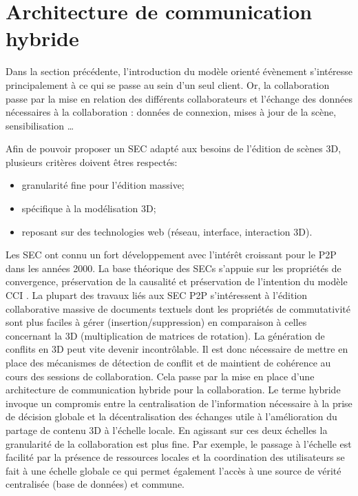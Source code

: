 \section{Architecture de communication hybride}


Dans la section précédente, l'introduction du modèle orienté évènement s'intéresse 
principalement à ce qui se passe au sein d'un seul client. Or, la collaboration 
passe par la mise en relation des différents collaborateurs et l'échange des 
données nécessaires à la collaboration : données de connexion, mises à jour de la 
scène, sensibilisation \dots 

Afin de pouvoir proposer un \gls{SEC} adapté aux besoins de l'édition de scènes 
3D, plusieurs critères doivent êtres respectés: 
\begin{itemize}
	\item granularité fine pour l'édition massive;
	\item spécifique à la modélisation 3D;
	\item reposant sur des technologies web (réseau, interface, interaction 3D).
\end{itemize}

Les \gls{SEC} ont connu un fort développement avec l'intérêt croissant 
pour le \gls{P2P} dans les années 2000. 
La base théorique des \glspl{SEC} s'appuie sur les propriétés de 
convergence, préservation de la 
causalité et préservation de l'intention du modèle \acrshort{CCI} 
\cite{Sun1998}. 
La plupart des travaux liés aux \gls{SEC} \gls{P2P} s'intéressent à 
l'édition collaborative massive de documents textuels dont les propriétés 
de commutativité sont plus faciles à gérer (insertion/suppression) en 
comparaison à celles concernant la 3D (multiplication de matrices de 
rotation). La génération de conflits en 3D peut vite devenir incontrôlable. Il est 
donc nécessaire de mettre en place des mécanismes de détection de 
conflit et de maintient de cohérence au cours des sessions de 
collaboration. 
Cela passe par la mise en place d'une architecture de communication 
hybride pour la collaboration. 
Le terme \og hybride\fg{} invoque un compromis entre la 
centralisation de l'information nécessaire à la prise de décision globale et 
la décentralisation des échanges utile à l'amélioration du partage de 
contenu 3D à l'échelle locale. 
En agissant sur ces deux échelles la granularité de la collaboration est plus fine. 
Par exemple, le passage à l'échelle est facilité par la présence de 
ressources locales et la coordination des utilisateurs se fait à une échelle 
globale ce qui permet également l'accès à une source de vérité 
centralisée (base de données) et commune.

